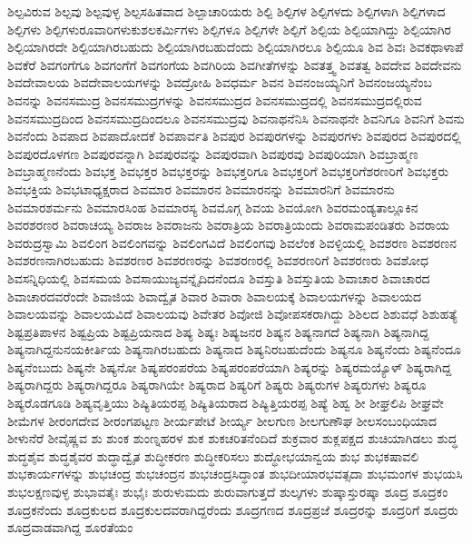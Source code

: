 {ಶಿಲ್ಪವಿರುವ
ಶಿಲ್ಪವು
ಶಿಲ್ಪವುಳ್ಳ
ಶಿಲ್ಪಸಹಿತವಾದ
ಶಿಲ್ಪಾಚಾರಿಯರು
ಶಿಲ್ಪಿ
ಶಿಲ್ಪಿಗಳ
ಶಿಲ್ಪಿಗಳದು
ಶಿಲ್ಪಿಗಳಾಗಿ
ಶಿಲ್ಪಿಗಳಾದ
ಶಿಲ್ಪಿಗಳು
ಶಿಲ್ಪಿಗಳುರೂವಾರಿಗಳುಕುಶಲಕರ್ಮಿಗಳು
ಶಿಲ್ಪಿಗಳೂ
ಶಿಲ್ಪಿಗಳೇ
ಶಿಲ್ಪಿಗೆ
ಶಿಲ್ಪಿಯ
ಶಿಲ್ಪಿಯಾಗಿದ್ದು
ಶಿಲ್ಪಿಯಾಗಿರ
ಶಿಲ್ಪಿಯಾಗಿರದೇ
ಶಿಲ್ಪಿಯಾಗಿರಬಹುದು
ಶಿಲ್ಪಿಯಾಗಿರಬಹುದೆಂದು
ಶಿಲ್ಪಿಯಾಗಿರಲೂ
ಶಿಲ್ಪಿಯೂ
ಶಿವ
ಶಿವಃ
ಶಿವಕಥಾಳಾಪೆ
ಶಿವಕೆರೆ
ಶಿವಗಂಗೆಗೂ
ಶಿವಗಂಗೆಗೆ
ಶಿವಗಂಗೆಯ
ಶಿವಗಿರಿಯ
ಶಿವಗೀತೆಗಳನ್ನು
ಶಿವತತ್ತ್ವ
ಶಿವತತ್ವ
ಶಿವದೇವ
ಶಿವದೇವನು
ಶಿವದೇವಾಲಯ
ಶಿವದೇವಾಲಯಗಳನ್ನು
ಶಿವದ್ರೋಹಿ
ಶಿವಧರ್ಮ
ಶಿವನ
ಶಿವನಂಜಯ್ಯನಿಗೆ
ಶಿವನಂಜಯ್ಯನೆಂಬ
ಶಿವನನ್ನು
ಶಿವನಸಮುದ್ರ
ಶಿವನಸಮುದ್ರಗಳನ್ನು
ಶಿವನಸಮುದ್ರದ
ಶಿವನಸಮುದ್ರದಲ್ಲಿ
ಶಿವನಸಮುದ್ರದಲ್ಲಿರುವ
ಶಿವನಸಮುದ್ರದಿಂದ
ಶಿವನಸಮುದ್ರದಿಂದಲೂ
ಶಿವನಸಮುದ್ರವು
ಶಿವನಾಥನೆನಿಸಿ
ಶಿವನಾಥನೇ
ಶಿವನಿಗೂ
ಶಿವನಿಗೆ
ಶಿವನು
ಶಿವನೆಂದು
ಶಿವಪಾದ
ಶಿವಪಾದೋದಕೆ
ಶಿವಪಾರ್ವತಿ
ಶಿವಪುರ
ಶಿವಪುರಗಳನ್ನು
ಶಿವಪುರಗಳು
ಶಿವಪುರದ
ಶಿವಪುರದಲ್ಲಿ
ಶಿವಪುರದೊಳಗಣ
ಶಿವಪುರವನ್ನಾಗಿ
ಶಿವಪುರವನ್ನು
ಶಿವಪುರವಾಗಿ
ಶಿವಪುರವು
ಶಿವಪುರಿಯಾಗಿ
ಶಿವಬ್ರಾಹ್ಮಣ
ಶಿವಬ್ರಾಹ್ಮಣನೆಂದು
ಶಿವಭಕ್ತ
ಶಿವಭಕ್ತರ
ಶಿವಭಕ್ತರನ್ನು
ಶಿವಭಕ್ತರಿಗೂ
ಶಿವಭಕ್ತರಿಗೆ
ಶಿವಭಕ್ತರಿಗೆಶರಣರಿಗೆ
ಶಿವಭಕ್ತರು
ಶಿವಭಕ್ತಿಯ
ಶಿವಭಟಾಧ್ಯಕ್ಷರಾದ
ಶಿವಮಾರ
ಶಿವಮಾರನ
ಶಿವಮಾರನನ್ನು
ಶಿವಮಾರನಿಗೆ
ಶಿವಮಾರನು
ಶಿವಮಾರಶರ್ಮನು
ಶಿವಮಾರಸಿಂಹ
ಶಿವಮಾರಸ್ಯ
ಶಿವಮೊಗ್ಗ
ಶಿವಯ
ಶಿವಯೋಗಿ
ಶಿವರಮಂಡ್ಯತಾಲ್ಲೂಕಿನ
ಶಿವರಶರಣರ
ಶಿವರಾಚಯ್ಯ
ಶಿವರಾಜ
ಶಿವರಾಜನು
ಶಿವರಾತ್ರಿಯ
ಶಿವರಾತ್ರಿಯಂದು
ಶಿವರಾಮಪಂಡಿತರು
ಶಿವರಾಯ
ಶಿವರುದ್ರಸ್ವಾಮಿ
ಶಿವಲಿಂಗ
ಶಿವಲಿಂಗವನ್ನು
ಶಿವಲಿಂಗವಿದೆ
ಶಿವಲಿಂಗವು
ಶಿವಲೆಂಕ
ಶಿವಳ್ಳಿಯಲ್ಲಿ
ಶಿವಶರಣ
ಶಿವಶರಣನ
ಶಿವಶರಣನಾಗಿರಬಹುದು
ಶಿವಶರಣರ
ಶಿವಶರಣರನ್ನು
ಶಿವಶರಣರಲ್ಲಿ
ಶಿವಶರಣರಿಗೆ
ಶಿವಶರಣರು
ಶಿವಶೋಧ
ಶಿವಸನ್ನಿಧಿಯಲ್ಲಿ
ಶಿವಸಮಯ
ಶಿವಸಾಯುಜ್ಯವನ್ನೈದಿದನೆಂದೂ
ಶಿವಸ್ತುತಿ
ಶಿವಸ್ತುತಿಯ
ಶಿವಾಚಾರ
ಶಿವಾಚಾರದ
ಶಿವಾಚಾರದವರೆಂದೇ
ಶಿವಾಜಿಯ
ಶಿವಾದ್ವೈತ
ಶಿವಾರ
ಶಿವಾರಾ
ಶಿವಾಲಯಕ್ಕೆ
ಶಿವಾಲಯಗಳನ್ನು
ಶಿವಾಲಯದ
ಶಿವಾಲಯವನ್ನು
ಶಿವಾಲಯವಿದೆ
ಶಿವಾಲಯವು
ಶಿವೇತರ
ಶಿವೋಜಿ
ಶಿವೋಪಸಕರಾಗಿದ್ದು
ಶಿಶಿಲದ
ಶಿಶುವಧೆ
ಶಿಶುಹತ್ಯೆ
ಶಿಷ್ಟಪ್ರತಿಪಾಳನ
ಶಿಷ್ಟಪ್ರಿಯ
ಶಿಷ್ಟಪ್ರಿಯನಾದ
ಶಿಷ್ಯ
ಶಿಷ್ಯಃ
ಶಿಷ್ಯಜನರ
ಶಿಷ್ಯನ
ಶಿಷ್ಯನಾಗದೆ
ಶಿಷ್ಯನಾಗಿ
ಶಿಷ್ಯನಾಗಿದ್ದ
ಶಿಷ್ಯನಾಗಿದ್ದನುನಯಕೀರ್ತಿಯ
ಶಿಷ್ಯನಾಗಿರಬಹುದು
ಶಿಷ್ಯನಾದ
ಶಿಷ್ಯನಿರಬಹುದೆಂದು
ಶಿಷ್ಯನೂ
ಶಿಷ್ಯನೆಂದು
ಶಿಷ್ಯನೆಂದೂ
ಶಿಷ್ಯನೆಂಬುದು
ಶಿಷ್ಯನೇ
ಶಿಷ್ಯನೋ
ಶಿಷ್ಯಪರಂಪರೆಯ
ಶಿಷ್ಯಪರಂಪರೆಯಾಗಿ
ಶಿಷ್ಯರನ್ನು
ಶಿಷ್ಯರಮಯ್ಯೊಳ್
ಶಿಷ್ಯರಾಗಿದ್ದ
ಶಿಷ್ಯರಾಗಿದ್ದರು
ಶಿಷ್ಯರಾಗಿದ್ದರೂ
ಶಿಷ್ಯರಾಗಿಯೇ
ಶಿಷ್ಯರಾದ
ಶಿಷ್ಯರಿಗೆ
ಶಿಷ್ಯರು
ಶಿಷ್ಯರುಗಳ
ಶಿಷ್ಯರುಗಳು
ಶಿಷ್ಯರೂ
ಶಿಷ್ಯರೊಡಗೂಡಿ
ಶಿಷ್ಯವೃತ್ತಿಯು
ಶಿಷ್ಯಿತಿಯರಪ್ಪ
ಶಿಷ್ಯಿತಿಯರಾದ
ಶಿಷ್ಯಿತ್ತಿಯರಪ್ಪ
ಶಿಷ್ಯೆ
ಶಿಹ್ವ
ಶೀ
ಶೀಘ್ರಲಿಪಿ
ಶೀಘ್ರವೇ
ಶೀಮೆಗಳ
ಶೀರಂಗದೇವ
ಶೀರಂಗಪಟ್ಟಣ
ಶೀರ್ಯಪೇಟೆ
ಶೀರ್ಯ್ಯ
ಶೀಲಗುಣ
ಶೀಲಗುಣೌಘ
ಶೀಲಸಂಬಂಧಿಯಾದ
ಶೀಳುನೆರೆ
ಶೀವೈಷ್ಣವ
ಶು
ಶುಂಕ
ಶುಂಣ್ನಹರಳ
ಶುಕ
ಶುಕಚರಿತನೆಂದಿದೆ
ಶುಕ್ರವಾರ
ಶುಕ್ಲಪಕ್ಷದ
ಶುಚಿಯಾಗಿಡಲು
ಶುದ್ಧ
ಶುದ್ಧಶೈವ
ಶುದ್ಧಶೈವರ
ಶುದ್ಧಾದ್ವೈತ
ಶುದ್ಧೀಕರಣ
ಶುದ್ಧೀಕರಿಸಲು
ಶುದ್ಧೋಭಯಾನ್ವಯ
ಶುಭ
ಶುಭಕಷಾವಲಿ
ಶುಭಕಾರ್ಯಗಳನ್ನು
ಶುಭಚಂದ್ರ
ಶುಭಚಂದ್ರನ
ಶುಭಚಂದ್ರಸಿದ್ಧಾಂತ
ಶುಭದೀಯಾರಭವತ್ಸದಾ
ಶುಭಮಂಗಳ
ಶುಭಯಸಿ
ಶುಭಲಕ್ಷಣವುಳ್ಳ
ಶುಭಾವತೈಃ
ಶುಭೈಃ
ಶುರುಳುಮದು
ಶುರುವಾಗುತ್ತದೆ
ಶುಲ್ಕಗಳು
ಶುಷ್ಕಾಸ್ತುರಷ್ಕಾ
ಶೂದ್ರ
ಶೂದ್ರಕಂ
ಶೂದ್ರಕನೆಂದು
ಶೂದ್ರಕುಲದ
ಶೂದ್ರಕುಲದವರಾಗಿದ್ದರೆಂದು
ಶೂದ್ರಗಣದ
ಶೂದ್ರಪ್ರಜೆ
ಶೂದ್ರರನ್ನು
ಶೂದ್ರರಿಗೆ
ಶೂದ್ರರು
ಶೂದ್ರವಾಡವಾಗಿದ್ದ
ಶೂರತೆಯಂ
}
